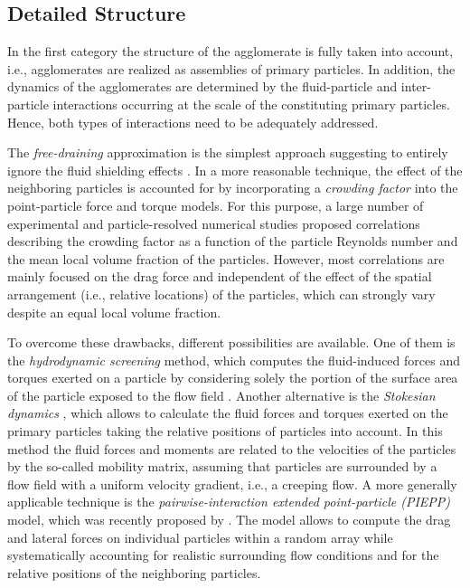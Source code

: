 \subsection{Detailed Structure}

 In the first category the structure of the agglomerate is fully taken
 into account, i.e., agglomerates are realized as assemblies of
 primary particles. In addition, the dynamics of the agglomerates are
 determined by the fluid-particle and inter-particle interactions
 occurring at the scale of the constituting primary particles. Hence,
 both types of interactions need to be adequately addressed.



 The \emph{free-draining} approximation is the simplest approach
 suggesting to entirely ignore the fluid shielding effects
 \citep[e.g.,][]{becker2009restructuring}.  In a more reasonable
 technique, the effect of the neighboring particles is accounted for
 by incorporating a \emph{crowding factor} into the point-particle
 force and torque models. For this purpose, a large number of
 experimental \citep[e.g.,][]{di1994voidage} and particle-resolved
 numerical \citep[e.g.,][]{beetstra2007drag} studies proposed
 correlations describing the crowding factor as a function of the
 particle Reynolds number and the mean local volume fraction of the
 particles. However, most correlations are mainly focused on the drag
 force and independent of the effect of the spatial arrangement (i.e.,
 relative locations) of the particles, which can strongly vary despite
 an equal local volume fraction.

 To overcome these drawbacks, different possibilities are
 available. One of them is the \emph{hydrodynamic screening} method,
 which computes the fluid-induced forces and torques exerted on a
 particle by considering solely the portion of the surface area of the
 particle exposed to the flow field \citep[]{higashitani2001}.
 Another alternative is the \emph{Stokesian dynamics}
 \citep{durlofsky1987dynamic}, which allows to calculate the fluid
 forces and torques exerted on the primary particles taking the
 relative positions of particles into account. In this method the
 fluid forces and moments are related to the velocities of the
 particles by the so-called mobility matrix, assuming that particles
 are surrounded by a flow field with a uniform velocity gradient,
 i.e., a creeping flow. A more generally applicable technique is the
 \emph{pairwise-interaction extended point-particle (PIEPP)} model,
 which was recently proposed by
 \citet{akiki2017pairwise,akiki2017pairwisepar,balachandar2020towards}.
 The model allows to compute the drag and lateral forces on individual
 particles within a random array while systematically accounting for
 realistic surrounding flow conditions and for the relative positions
 of the neighboring particles. \newline

